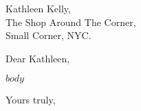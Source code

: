 \documentclass[a4paper, 12pt]{letter}
\begin{document}
\begin{letter}
{
    Kathleen Kelly,\\
    The Shop Around The Corner,\\
    Small Corner, NYC.
}

\opening{Dear Kathleen,}

$body$

\longindentation=0pt
\closing{Yours truly,}

\end{letter}
\end{document}
